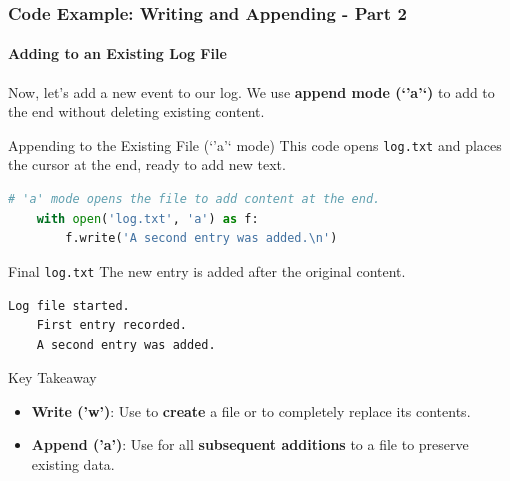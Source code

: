 \documentclass{beamer}
\begin{document}
\begin{frame}[fragile]
    \frametitle{Code Example: Writing and Appending - Part 2}
    \framesubtitle{Adding to an Existing Log File}

    Now, let's add a new event to our log. We use \textbf{append mode (`'a'`)} to add to the end without deleting existing content.
    \vspace{1em}

    \begin{block}{Appending to the Existing File (`'a'` mode)}
    This code opens \texttt{log.txt} and places the cursor at the end, ready to add new text.
    \begin{lstlisting}[language=Python]
    # 'a' mode opens the file to add content at the end.
    with open('log.txt', 'a') as f:
        f.write('A second entry was added.\n')
    \end{lstlisting}
    \end{block}

    \begin{block}{Final \texttt{log.txt}}
    The new entry is added after the original content.
    \begin{lstlisting}[language=text]
    Log file started.
    First entry recorded.
    A second entry was added.
    \end{lstlisting}
    \end{block}

    \begin{alertblock}{Key Takeaway}
        \begin{itemize}
            \item \textbf{Write ('w')}: Use to \textbf{create} a file or to \alert{completely replace} its contents.
            \item \textbf{Append ('a')}: Use for all \textbf{subsequent additions} to a file to \alert{preserve} existing data.
        \end{itemize}
    \end{alertblock}
\end{frame}
\end{document}

